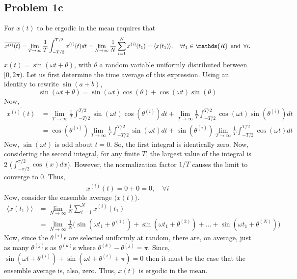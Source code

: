 \begin{homeworkProblem}
   \subsection{Problem 1c}
   For $ x(t) $ to be ergodic in the mean requires that
   \[
      \overline{x^{(i)}(t)} = \lim_{T \to \infty} \frac{1}{T}
      \int_{-T/2}^{T/2} x^{(i)}(t) dt =
      \lim_{N \to \infty} \frac{1}{N} \sum^{N}_{i=1} x^{(i)}(t_{1}) =
      \langle x(t_{1}) \rangle
      ,\quad\forall t_{1} \in \mathds{R} \enskip\text{and} \enskip\forall i.
   \]
   $ x(t) = \sin(\omega t + \theta) $, with $ \theta $ a random variable
   uniformly distributed between $ [0,2\pi) $. Let us first determine the time
   average of this expression. Using an identity to rewrite $ \sin(a+b) $,
   \[
      \sin(\omega t + \theta) = \sin(\omega t )\cos(\theta) +
      \cos(\omega t)\sin(\theta)
   \]
   Now,
   \begin{align*}
      \overline{x^{(i)}(t)} &=
      \lim_{T \to \infty} \frac{1}{T} \int_{-T/2}^{T/2} \sin(\omega t)
      \cos(\theta^{(i)}) dt +
      \lim_{T \to \infty} \frac{1}{T} \int_{-T/2}^{T/2} \cos(\omega t)
      \sin(\theta^{(i)}) dt \\
      &= \cos(\theta^{(i)})\lim_{T \to \infty} \frac{1}{T} \int_{-T/2}^{T/2}
      \sin(\omega t) dt +
      \sin(\theta^{(i)}) \lim_{T \to \infty} \frac{1}{T} \int_{-T/2}^{T/2} \cos(\omega t)
      dt
   \end{align*}
      Now, $ \sin(\omega t) $ is odd about $ t = 0 $. So, the first
      integral is identically zero. Now, considering the second integral, for
      any finite $ T $, the largest value of the
      integral is 2 ($ \int_{-\pi/2}^{\pi/2} \cos(x) dx $). However, the
      normalization factor $ 1/T $ causes the limit to converge to $ 0 $. Thus,
      \[
         \overline{x^{(i)}(t)} = 0 + 0 = 0,\quad \forall i
      \]
      Now, consider the ensemble average $ \langle x(t) \rangle $.
      \begin{align}
         \langle x(t_{1}) \rangle
         &= \lim_{N \to \infty} \frac{1}{N} \sum^{N}_{i=1}
         x^{(i)}(t_{1}) \\
         &= \lim_{N \to \infty} \frac{1}{N} \bigl(
         \sin(\omega t_1 + \theta^{(1)}) +
         \sin(\omega t_1 + \theta^{(2)}) +
      \ldots + \sin(\omega t_1 + \theta^{(N)}) \bigr)
      \end{align}
      Now, since the $ \theta^{(i)} $s are selected uniformly at random, there are,
      on average, just as many $ \theta^{(j)} $s as $ \theta^{(k)} $s where $
      \theta^{(k)} -
      \theta^{(j)} = \pi$. Since, $ \sin(\omega t + \theta^{(i)}) + \sin(\omega t +
      \theta^{(i)} + \pi) = 0 $ then it must be the case that the ensemble average
      is, also, zero. Thus, $ x(t) $ is ergodic in the mean.


\end{homeworkProblem}
